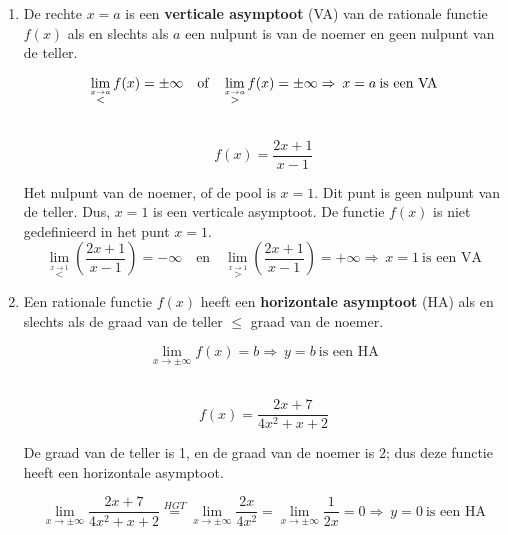 \begin{enumerate}
\item De rechte $x=a$ is een \textbf{verticale asymptoot} (VA) van de
rationale functie $f(x)$ als en slechts als $a$ een nulpunt is van
de noemer en geen nulpunt van de teller.

\begin{equation*}
\lim_{\overset{x\rightarrow a}{<}}f(x)=\pm\infty\quad\textrm{of}\quad \lim_{\overset{x\rightarrow a}{>}}f(x)=\pm\infty \\
		\Rightarrow\:x=a\:\textrm{is een VA}
\end{equation*}

\begin{voorbeeld}
\ 
\begin{equation*}
f(x)=\frac{2x+1}{x-1}
\end{equation*}

Het nulpunt van de noemer, of de pool is $x=1$. Dit punt is geen
nulpunt van de teller. Dus, $x=1$ is een verticale asymptoot. De
functie $f(x)$ is niet gedefinieerd in het punt $x=1$.
\begin{equation*}
\lim_{\overset{x\rightarrow1}{<}}\left(\frac{2x+1}{x-1}\right)=-\infty\quad\textrm{en}\quad \lim_{\overset{x\rightarrow1}{>}}\left(\frac{2x+1}{x-1}\right)=+\infty
\Rightarrow\:x=1\:\textrm{is een VA}
\end{equation*}

\end{voorbeeld}

\item Een rationale functie $f(x)$ heeft een \textbf{horizontale asymptoot}
(HA) als en slechts als de graad van de teller \ensuremath{\le} graad
van de noemer.

\begin{equation*}
\lim_{x\to\pm\infty}f(x)=b
\Rightarrow\:y=b\:\textrm{is een HA}
\end{equation*}

\begin{voorbeeld}
\ 
\begin{equation*}
f(x)=\frac{2x+7}{4x^{2}+x+2}
\end{equation*}

De graad van de teller is 1, en de graad van de noemer is 2; dus deze
functie heeft een horizontale asymptoot.

\begin{equation*}
\lim_{x\to\pm\infty}\frac{2x+7}{4x^{2}+x+2}\overset{HGT}{=} \lim_{x\to\pm\infty}\frac{2x}{4x^{2}}=\lim_{x\to\pm\infty}\frac{1}{2x}=0
\displaystyle \Rightarrow\:y=0\:\textrm{is een HA}
\end{equation*}


\end{voorbeeld}
\end{enumerate}
